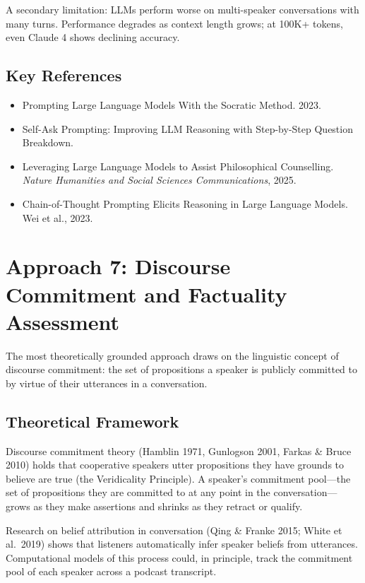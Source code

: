 \documentclass[11pt,letterpaper]{article}
\begin{document}
A secondary limitation: LLMs perform worse on multi-speaker conversations with many turns. Performance degrades as context length grows; at 100K+ tokens, even Claude 4 shows declining accuracy.

\subsection{Key References}

\begin{itemize}
  \item Prompting Large Language Models With the Socratic Method. 2023.
  \item Self-Ask Prompting: Improving LLM Reasoning with Step-by-Step Question Breakdown.
  \item Leveraging Large Language Models to Assist Philosophical Counselling. \textit{Nature Humanities and Social Sciences Communications}, 2025.
  \item Chain-of-Thought Prompting Elicits Reasoning in Large Language Models. Wei et al., 2023.
\end{itemize}

\section{Approach 7: Discourse Commitment and Factuality Assessment}

The most theoretically grounded approach draws on the linguistic concept of discourse commitment: the set of propositions a speaker is publicly committed to by virtue of their utterances in a conversation.

\subsection{Theoretical Framework}

Discourse commitment theory (Hamblin 1971, Gunlogson 2001, Farkas \& Bruce 2010) holds that cooperative speakers utter propositions they have grounds to believe are true (the Veridicality Principle). A speaker's commitment pool—the set of propositions they are committed to at any point in the conversation—grows as they make assertions and shrinks as they retract or qualify.

Research on belief attribution in conversation (Qing \& Franke 2015; White et al.\ 2019) shows that listeners automatically infer speaker beliefs from utterances. Computational models of this process could, in principle, track the commitment pool of each speaker across a podcast transcript.
\end{document}
